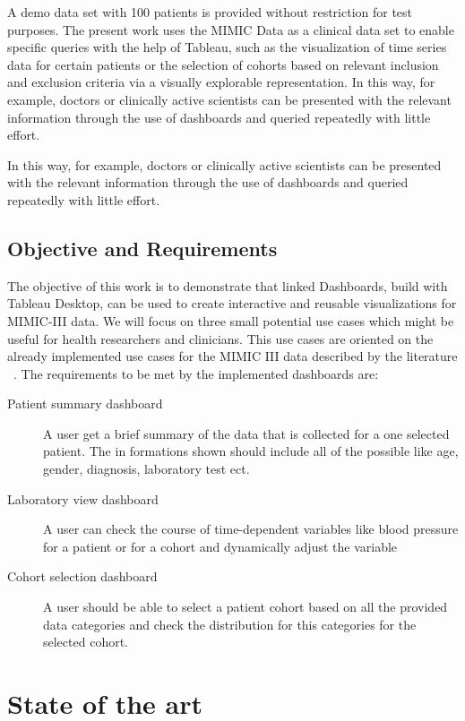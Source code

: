 \documentclass[aac,crcready]{iosart2x}
\begin{document}
A demo data set with 100 patients is provided without restriction for test purposes. 
The present work uses the MIMIC Data as a clinical data set to enable specific queries with the help of Tableau, such as the visualization of time series data for certain patients or the selection of cohorts based on relevant inclusion and exclusion criteria via a visually explorable representation. In this way, for example, doctors or clinically active scientists can be presented with the relevant information through the use of dashboards and queried repeatedly with little effort.

In this way, for example, doctors or clinically active scientists can be presented with the relevant information through the use of dashboards and queried repeatedly with little effort.

\subsection{Objective and Requirements}\label{s1.2}
%
The objective of this work is to demonstrate that linked Dashboards, build with Tableau Desktop, can be used to create interactive and reusable visualizations for MIMIC-III data. We will focus on three small potential use cases which might be useful for health researchers and clinicians. This use cases are oriented on the already implemented use cases for the MIMIC III data described by the literature ~\cite{Lee.2016, Festag.2019}.
The requirements to be met by the implemented dashboards are:
\begin{description}
\item[Patient summary dashboard] A user get a brief summary of the data that is collected for a one selected patient. The in formations shown should include all of the possible like age, gender, diagnosis, laboratory test ect.
\item[Laboratory view dashboard] A user can check the course of time-dependent variables like blood pressure for a patient or for a cohort and dynamically adjust the variable
\item[Cohort selection dashboard] A user should be able to select a patient cohort based on all the provided data categories and check the distribution for this categories for the selected cohort.
\end{description}


\section{State of the art}\label{s2}
%
\end{document}
